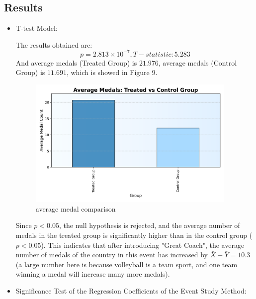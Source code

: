 \documentclass{mcmthesis}  %
\begin{document}
\subsection{Results}  %
\begin{itemize}  %
\item T-test Model:

The results obtained are: $$p = 2.813\times 10^{-7}, T-statistic: 5.283$$
And average medals (Treated Group) is $21.976$, 
 average medals (Control Group) is $11.691$, which is showed in Figure 9.\\
\begin{figure}[H]  %
    \small
    \centering  %
    \includegraphics[width=10cm]{average_medal_comparison.png}  %
    \caption{average medal comparison} 
\end{figure}  %
Since \(p < 0.05\), the null hypothesis is rejected, and the average number of medals in the treated group is significantly higher than in the control group (\(p < 0.05\)). This indicates that after introducing "Great Coach", the average number of medals of the country in this event has increased by \( \bar{X} - \bar{Y} = 10.3\) (a large number here is because volleyball is a team sport, and one team winning a medal will increase many more medals).
\item Significance Test of the Regression Coefficients of the Event Study Method:


\end{itemize}
\end{document}
